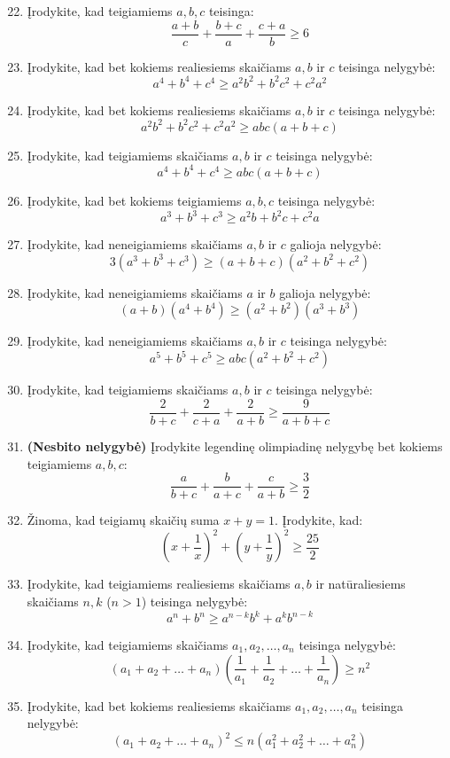 \documentclass[11pt,a4paper]{scrartcl}
\begin{document}
\begin{enumerate}
    \setcounter{enumi}{21}

    \item Įrodykite, kad teigiamiems $a, b, c$ teisinga:
    $$ \frac{a+b}{c} + \frac{b+c}{a} + \frac{c+a}{b} \ge 6 $$

    \item Įrodykite, kad bet kokiems realiesiems skaičiams $a, b$ ir $c$ teisinga nelygybė:
    $$ a^4+b^4+c^4 \ge a^2b^2+b^2c^2+c^2a^2 $$

    \item Įrodykite, kad bet kokiems realiesiems skaičiams $a, b$ ir $c$ teisinga nelygybė:
    $$ a^2b^2+b^2c^2+c^2a^2 \ge abc(a+b+c) $$

    \item Įrodykite, kad teigiamiems skaičiams $a, b$ ir $c$ teisinga nelygybė:
    $$ a^4+b^4+c^4 \ge abc(a+b+c) $$

    \item Įrodykite, kad bet kokiems teigiamiems $a, b, c$ teisinga nelygybė:
    $$ a^3 + b^3 + c^3 \ge a^2b + b^2c + c^2a $$

    \item Įrodykite, kad neneigiamiems skaičiams $a, b$ ir $c$ galioja nelygybė:
    $$ 3(a^3+b^3+c^3) \ge (a+b+c)(a^2+b^2+c^2) $$

    \item Įrodykite, kad neneigiamiems skaičiams $a$ ir $b$ galioja nelygybė:
    $$ (a+b)(a^4+b^4) \ge (a^2+b^2)(a^3+b^3) $$

    \item Įrodykite, kad neneigiamiems skaičiams $a, b$ ir $c$ teisinga nelygybė:
    $$ a^5+b^5+c^5 \ge abc(a^2+b^2+c^2) $$

    \item Įrodykite, kad teigiamiems skaičiams $a, b$ ir $c$ teisinga nelygybė:
    $$ \frac{2}{b+c}+\frac{2}{c+a}+\frac{2}{a+b} \ge \frac{9}{a+b+c} $$

    \item \textbf{(Nesbito nelygybė)} Įrodykite legendinę olimpiadinę nelygybę bet kokiems teigiamiems $a, b, c$:
    $$ \frac{a}{b+c} + \frac{b}{a+c} + \frac{c}{a+b} \ge \frac{3}{2} $$

    \item Žinoma, kad teigiamų skaičių suma $x + y = 1$. Įrodykite, kad:
    $$ \left(x + \frac{1}{x}\right)^2 + \left(y + \frac{1}{y}\right)^2 \ge \frac{25}{2} $$

    \item Įrodykite, kad teigiamiems realiesiems skaičiams $a, b$ ir natūraliesiems skaičiams $n, k$ ($n>1$) teisinga nelygybė:
    $$ a^n+b^n \ge a^{n-k}b^k+a^kb^{n-k} $$

    \item Įrodykite, kad teigiamiems skaičiams $a_1, a_2, \dots, a_n$ teisinga nelygybė:
    $$ (a_1+a_2+\dots+a_n)\left(\frac{1}{a_1}+\frac{1}{a_2}+\dots+\frac{1}{a_n}\right) \ge n^2 $$

    \item Įrodykite, kad bet kokiems realiesiems skaičiams $a_1, a_2, \dots, a_n$ teisinga nelygybė:
    $$ (a_1+a_2+\dots+a_n)^2 \le n(a_1^2+a_2^2+\dots+a_n^2) $$
\end{enumerate}


\end{document}

